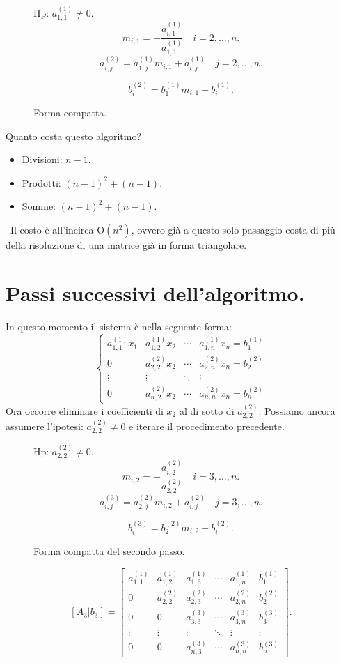 \begin{figure}
Hp: $a_{1,1}^{(1)} \neq 0$.
\[
m_{i,1} = -\frac{a_{i,1}^{(1)}}{a_{1,1}^{(1)}} \quad i = 2, \ldots, n.
\]
\[
a_{i,j}^{(2)} = a_{1,j}^{(1)}m_{i,1} + a_{i,j}^{(1)} \quad j = 2, \ldots, n.
\]

\[
b_i^{(2)} = b_1^{(1)}m_{i,1} + b_i^{(1)}.
\]
\caption{Forma compatta.}
\end{figure}


Quanto costa questo algoritmo?
\begin{itemize}
\item[]Divisioni: $n-1$.
\item[]Prodotti: $(n-1)^2 + (n-1)$.
\item[]Somme: $(n-1)^2 + (n-1)$.
\end{itemize}\
Il costo è all'incirca $\textrm{O}(n^2)$, ovvero già a questo solo passaggio
costa di più della risoluzione di una matrice già in forma
triangolare.

\section{Passi successivi dell'algoritmo.}
In questo momento il sistema è nella seguente forma:
\[
\left\{
\begin{array}{cccc}
a_{1,1}^{(1)}x_1 & a_{1,2}^{(1)}x_2 & \cdots & a_{1,n}^{(1)}x_n = b_{1}^{(1)}\\
0 & a_{2,2}^{(2)}x_2 & \cdots & a_{2,n}^{(2)}x_n = b_{2}^{(2)}\\
\vdots & \vdots&\ddots & \vdots \\
0 & a_{n,2}^{(2)}x_2 & \cdots & a_{n,n}^{(2)}x_n = b_{n}^{(2)}
\end{array}\right .
\]
Ora occorre eliminare i coefficienti di $x_2$ al di sotto di $a_{2,2}^{(2)}$.
Possiamo ancora assumere l'ipotesi: $a_{2,2}^{(2)} \neq 0$ e iterare il
procedimento precedente.
\begin{figure}[h]
Hp: $a_{2,2}^{(2)} \neq 0$.
\[
m_{i,2} = -\frac{a_{i,2}^{(2)}}{a_{2,2}^{(2)}} \quad i = 3, \ldots, n.
\]
\[
a_{i,j}^{(3)} = a_{2,j}^{(2)}m_{i,2} + a_{i,j}^{(2)} \quad j = 3, \ldots, n.
\]

\[
b_i^{(3)} = b_2^{(2)}m_{i,2} + b_i^{(2)}.
\]
\caption{Forma compatta del secondo passo.}
\end{figure}
\[
[A_3|b_3] = \left[
\begin{array}{ccccc|c}
a_{1,1}^{(1)} & a_{1,2}^{(1)} & a_{1,3}^{(1)} & \cdots& a_{1,n}^{(1)} &  b_1^{(1)}\\
0 & a_{2,2}^{(2)} & a_{2,3}^{(2)} & \cdots& a_{2,n}^{(2)} &  b_2^{(2)}\\
0 & 0 & a_{3,3}^{(3)} & \cdots & a_{3,n}^{(3)} &b_3^{(3)}\\
\vdots & \vdots & \vdots & \ddots & \vdots&  \vdots\\
0 & 0 & a_{n,3}^{(3)} & \cdots & a_{n,n}^{(3)} & b_n^{(3)}
\end{array} \right].
\]

